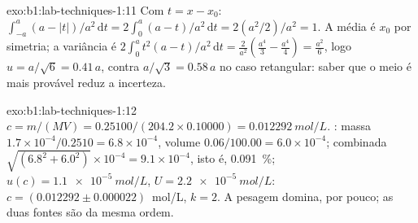 \begin{solution}{exo:b1:lab-techniques-1:11}
Com $t = x - x_0$: $\int_{-a}^{a} (a - |t|)/a^2 \,\mathrm{d}t =
2 \int_0^a (a - t)/a^2 \,\mathrm{d}t = 2 (a^2/2)/a^2 = 1$. A média é
$x_0$ por simetria; a variância é $2 \int_0^a t^2 (a - t)/a^2
\,\mathrm{d}t = \frac{2}{a^2}\left(\frac{a^4}{3} - \frac{a^4}{4}\right) =
\frac{a^2}{6}$, logo $u = a/\sqrt6 = 0.41\,a$, contra $a/\sqrt3 = 0.58\,a$
no caso retangular: saber que o meio é mais provável reduz a
incerteza.
\end{solution}

\begin{solution}{exo:b1:lab-techniques-1:12}
$c = m/(MV) = 0.25100/(204.2 \times 0.10000) = \qty{0.012292}{mol/L}$.
: massa $1.7 \times 10^{-4}/0.2510 = 6.8 \times
10^{-4}$, volume $0.06/100.00 = 6.0 \times 10^{-4}$; combinada
$\sqrt{(6.8^2 + 6.0^2)} \times 10^{-4} = 9.1 \times 10^{-4}$, isto é,
\qty{0.091}{\percent}; $u(c) = \qty{1.1e-5}{mol/L}$, $U = \qty{2.2e-5}{mol/L}$:
$c = (0.012292 \pm 0.000022)$~mol/L, $k = 2$. A pesagem domina, por
pouco; as duas fontes são da mesma ordem.
\end{solution}

